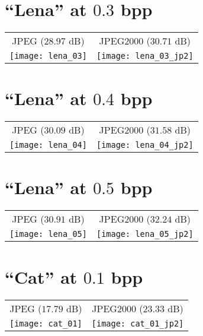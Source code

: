 \section*{``Lena'' at $0.3$ bpp}
\begin{center}
  \begin{tabular}{cc}
    JPEG ($28.97$ dB) & JPEG2000 ($30.71$ dB) \\
    \texttt{[image: lena\_03]} &
    \texttt{[image: lena\_03\_jp2]}
  \end{tabular}
\end{center}

\section*{``Lena'' at $0.4$ bpp}
\begin{center}
  \begin{tabular}{cc}
    JPEG ($30.09$ dB) & JPEG2000 ($31.58$ dB) \\
    \texttt{[image: lena\_04]} &
    \texttt{[image: lena\_04\_jp2]}
  \end{tabular}
\end{center}

\section*{``Lena'' at $0.5$ bpp}
\begin{center}
  \begin{tabular}{cc}
    JPEG ($30.91$ dB) & JPEG2000 ($32.24$ dB) \\
    \texttt{[image: lena\_05]} &
    \texttt{[image: lena\_05\_jp2]}
  \end{tabular}
\end{center}

\section*{``Cat'' at $0.1$ bpp}
\begin{center}
  \begin{tabular}{cc}
    JPEG ($17.79$ dB) & JPEG2000 ($23.33$ dB) \\
    \texttt{[image: cat\_01]} &
    \texttt{[image: cat\_01\_jp2]}
  \end{tabular}
\end{center}

